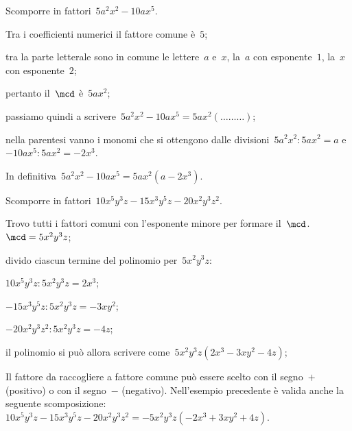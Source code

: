\begin{exrig}
 \begin{esempio}
Scomporre in fattori~$5a^{2}x^{2}-10ax^{5}$.
  \begin{enumeratea}
  \item Tra i coefficienti numerici il fattore comune è~$5$;
  \item tra la parte letterale sono in comune le lettere~$a$ e~$x$, la~$a$ con esponente~$1$, la~$x$ con esponente~$2$;
  \item pertanto il~$\mcd$ è~$5ax^{2}$;
  \item passiamo quindi a scrivere~$5a^{2}x^{2}-10ax^{5}=5ax^{2}(\ldots \ldots \ldots)$;
  \item nella parentesi vanno i monomi che si ottengono dalle divisioni~$5a^{2}x^{2}:5ax^{2}=a$ e~$-10ax^{5}:5ax^{2}=-2x^{3}$.
  \end{enumeratea}
  In definitiva~$5a^{2}x^{2}-10ax^{5}=5ax^{2}(a-2x^{3})$.
 \end{esempio}

 \begin{esempio}
Scomporre in fattori~$10x^{5}y^{3}z-15x^{3}y^{5}z-20x^{2}y^{3}z^{2}$.
 \begin{enumeratea}
 \item Trovo tutti i fattori comuni con l'esponente minore per formare il~$\mcd$.\, $\mcd=5x^{2}y^{3}z$;
 \item divido ciascun termine del polinomio per~$5x^{2}y^{3}z$:
   \begin{itemize*}
   \item $10x^{5}y^{3}z:5x^{2}y^{3}z=2x^{3}$;
   \item $-15x^{3}y^{5}z:5x^{2}y^{3}z=-3xy^{2}$;
   \item $-20x^{2}y^{3}z^{2}:5x^{2}y^{3}z=-4z$;
   \end{itemize*}
 \item il polinomio si può allora scrivere come~$5x^{2}y^{3}z (2x^{3}-3xy^{2}-4z)$;
 \item Il fattore da raccogliere a fattore comune può essere scelto con il segno~$+$ (positivo) o con il segno~$−$ (negativo).
    Nell'esempio precedente è valida anche la seguente 
    scomposizione:~$10x^{5}y^{3}z-15x^{3}y^{5}z-20x^{2}y^{3}z^{2}=-5x^{2}y^{3}z (-2x^{3}+3xy^{2}+4z)$.
 \end{enumeratea}
 \end{esempio}


\end{exrig}

